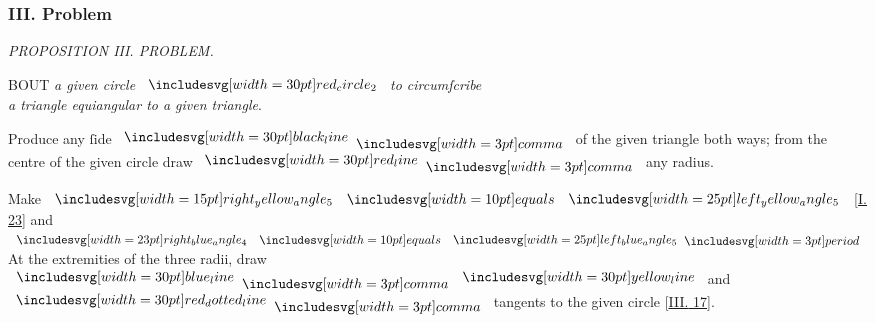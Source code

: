 \documentclass[12pt,preview]{standalone}
\begin{document}
\subsubsection{III. Problem}

\begin{minipage}[t]{0.64\textwidth}
  \vspace{0pt}

  \begin{center}
    \textit{PROPOSITION III. PROBLEM.}\label{book4pr3} \\
  \end{center}

  \hfill

  \begin{center}
    \raggedright \lettrine[lines=4, loversize=1, nindent=0pt]{}{}BOUT \textit{a given circle} $\img[0][0][30]{red_circle_2}$ \textit{to circumſcribe\\ a triangle equiangular to a given triangle}.
  \end{center}

  \hfill

  \hfill

  \hfill

  Produce any ſide $\blackline \bcomma$ of the given triangle both ways; from the centre of the given circle draw $\redline \bcomma$ any radius.

  \hfill

  \begin{center}
    Make $\img[0][0][15]{right_yellow_angle_5} \bequals \img{left_yellow_angle_5}$ [\hyperref[book1pr23]{\textsc{I.} 23}] and $\img[0][0][23]{right_blue_angle_4} \bequals \img{left_blue_angle_5} \bperiod$\\
    At the extremities of the three radii, draw $\blueline \bcomma \yellowline$ and\\
    $\dottedredline \bcomma$ tangents to the given circle [\hyperref[book3pr17]{\textsc{III.} 17}].
  \end{center}

  \hfill


\end{minipage}
\end{document}
